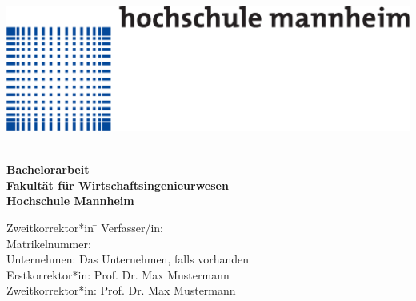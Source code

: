 \begin{titlepage}
\begin{minipage}{\textwidth}
		\vspace{-2cm}
		\noindent \includegraphics[scale=0.3]{img/logo.pdf}
\end{minipage}
\vspace{3em}
\sffamily
\begin{center}
	\textsf{\textbf{\Large{}\TheThesisTitle}}\\[5em]
	\textsf{\textbf{\large{}Bachelorarbeit}}\\[2em]
	\textsf{\textbf{Fakultät für Wirtschaftsingenieurwesen}\\[.5em] \textbf{Hochschule Mannheim}}
	
	\vspace{3em}
\vfill

\begin{minipage}{\textwidth}

\begin{tabbing}
	Zweitkorrektor*in \hspace{0.85cm}\=\kill
	Verfasser/in: \> \TheThesisAuthor \\[1.5mm]
	Matrikelnummer:  \\[1.5mm]
	Unternehmen: \> Das Unternehmen, falls vorhanden  \\[1.5mm]
	Erstkorrektor*in: \> Prof. Dr. Max Mustermann \\[1.5mm]
	Zweitkorrektor*in: \> Prof. Dr. Max Mustermann \\[1.5mm]

\end{tabbing}
\end{minipage}

\end{center}

\end{titlepage}